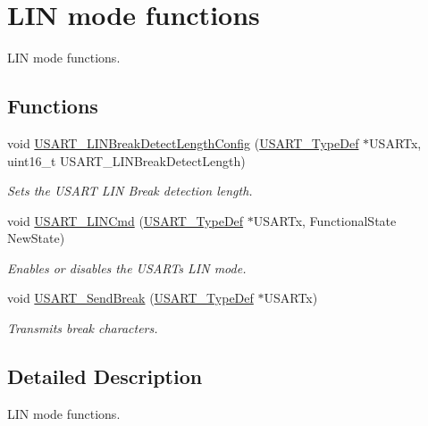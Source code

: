 \hypertarget{group___u_s_a_r_t___group4}{}\section{L\+IN mode functions}
\label{group___u_s_a_r_t___group4}


L\+IN mode functions.  


\subsection*{Functions}
\begin{DoxyCompactItemize}
\item 
void \hyperlink{group___u_s_a_r_t___group4_ga7bc2d291831cbc5e53e73337308029b5}{U\+S\+A\+R\+T\+\_\+\+L\+I\+N\+Break\+Detect\+Length\+Config} (\hyperlink{struct_u_s_a_r_t___type_def}{U\+S\+A\+R\+T\+\_\+\+Type\+Def} $\ast$U\+S\+A\+R\+Tx, uint16\+\_\+t U\+S\+A\+R\+T\+\_\+\+L\+I\+N\+Break\+Detect\+Length)
\begin{DoxyCompactList}\small\item\em Sets the U\+S\+A\+RT L\+IN Break detection length. \end{DoxyCompactList}\item 
void \hyperlink{group___u_s_a_r_t___group4_ga9fdd6296f4ca4acdfcbd58bf56bd4185}{U\+S\+A\+R\+T\+\_\+\+L\+I\+N\+Cmd} (\hyperlink{struct_u_s_a_r_t___type_def}{U\+S\+A\+R\+T\+\_\+\+Type\+Def} $\ast$U\+S\+A\+R\+Tx, Functional\+State New\+State)
\begin{DoxyCompactList}\small\item\em Enables or disables the U\+S\+A\+RT\textquotesingle{}s L\+IN mode. \end{DoxyCompactList}\item 
void \hyperlink{group___u_s_a_r_t___group4_ga39a3d33e23ee28529fa8f7259ce6811e}{U\+S\+A\+R\+T\+\_\+\+Send\+Break} (\hyperlink{struct_u_s_a_r_t___type_def}{U\+S\+A\+R\+T\+\_\+\+Type\+Def} $\ast$U\+S\+A\+R\+Tx)
\begin{DoxyCompactList}\small\item\em Transmits break characters. \end{DoxyCompactList}\end{DoxyCompactItemize}


\subsection{Detailed Description}
L\+IN mode functions. 


